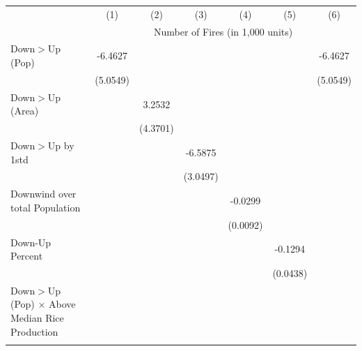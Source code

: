 \begin{tabular}{lcccccc}
\hline
& (1) & (2) & (3) & (4) & (5) & (6)\\
& \multicolumn{6}{c}{Number of Fires (in 1,000 units) }\\
\hline

Down$>$Up (Pop)&     -6.4627         &                     &                     &                     &                     &     -6.4627         \\
            &    (5.0549)         &                     &                     &                     &                     &    (5.0549)         \\
Down$>$Up (Area)&                     &      3.2532         &                     &                     &                     &                     \\
            &                     &    (4.3701)         &                     &                     &                     &                     \\
Down$>$Up by 1std&                     &                     &     -6.5875\sym{**} &                     &                     &                     \\
            &                     &                     &    (3.0497)         &                     &                     &                     \\
Downwind over total Population&                     &                     &                     &     -0.0299\sym{***}&                     &                     \\
            &                     &                     &                     &    (0.0092)         &                     &                     \\
Down-Up Percent&                     &                     &                     &                     &     -0.1294\sym{***}&                     \\
            &                     &                     &                     &                     &    (0.0438)         &                     \\
Down$>$Up (Pop) $\times$ Above Median Rice Production&                     &                     &                     &                     &                     &                     \\
            &                     &                     &                     &                     &                     &                     \\

\end{tabular}

